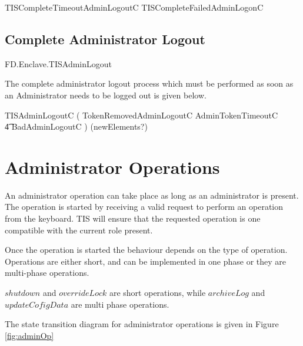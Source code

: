\begin{zed}
TISCompleteTimeoutAdminLogoutC  TISCompleteFailedAdminLogonC
\end{zed}

\subsection{Complete Administrator Logout}

\begin{traceunit}{FD.Enclave.TISAdminLogout}
\end{traceunit}

The complete administrator logout process which must be performed as
soon as an Administrator needs to be logged out is given below.

\begin{zed}
        TISAdminLogoutC  ( TokenRemovedAdminLogoutC \lor
        AdminTokenTimeoutC  
\\ \t4  \lor  BadAdminLogoutC ) \hide (newElements?)
\end{zed}



\section{Administrator Operations}
An administrator operation can take place as long as an administrator
is present. The operation is started by receiving a valid request to
perform an operation from the keyboard. TIS will ensure that the
requested operation is one compatible with the current role present.

Once the operation is started the behaviour depends on the type of
operation. Operations are either short, and can be implemented in one
phase or they are multi-phase operations. 

$shutdown$ and $overrideLock$ are short operations, while $archiveLog$
and $updateCofigData$ are multi phase operations.

The state transition diagram for administrator operations is given in
Figure \ref{fig:adminOp}

